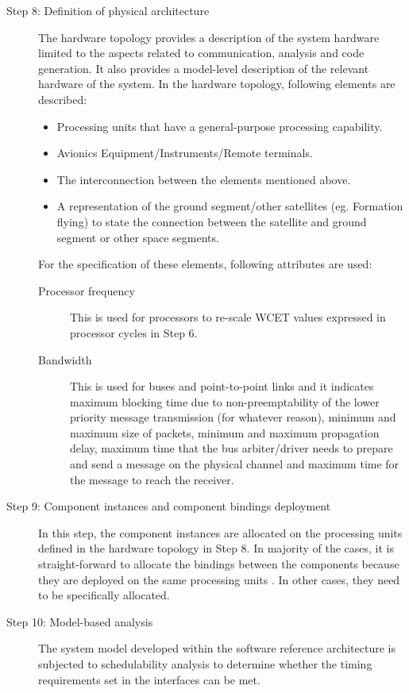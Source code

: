 \begin{description}
\item [Step 8: Definition of physical architecture] The hardware topology provides a description of the system hardware limited to the aspects related to communication, analysis and code generation. It also provides a model-level description of the relevant hardware of the system. In the hardware topology, following elements are described:
\begin{itemize}
\item Processing units that have a general-purpose processing capability.
\item Avionics Equipment/Instruments/Remote terminals.
\item The interconnection between the elements mentioned above. 
\item A representation of the ground segment/other satellites (eg. Formation flying) to state the connection between the satellite and ground segment or other space segments.
\end{itemize}		
For the specification of these elements, following attributes are used:
\begin{description}
\item [Processor frequency] This is used for processors to re-scale WCET values expressed in processor cycles in Step 6.
\item [Bandwidth] This is used for buses and point-to-point links and it indicates maximum blocking time due to non-preemptability of the lower priority message transmission (for whatever reason), minimum and maximum size of packets, minimum and maximum propagation delay, maximum time that the bus arbiter/driver needs to prepare and send a message on the physical channel and maximum time for the message to reach the receiver.    
\end{description}

\item [Step 9: Component instances and component bindings deployment] In this step, the component instances are allocated on the processing units defined in the hardware topology in Step 8. In majority of the cases, it is straight-forward to allocate the bindings between the components because they are deployed on the same processing units \cite{CompBasedProcess}. In other cases, they need to be specifically allocated.

\item [Step 10: Model-based analysis] The system model developed within the software reference architecture is subjected to schedulability analysis to determine whether the timing requirements set in the interfaces can be met.


\end{description}
